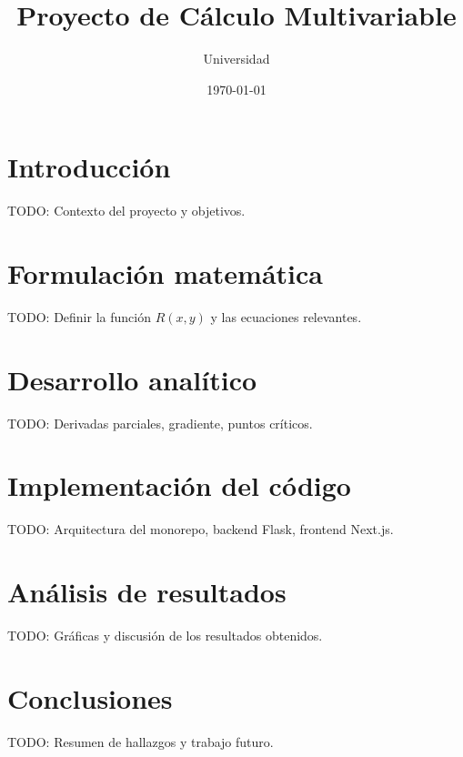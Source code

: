 \documentclass[12pt, letterpaper]{article}
\title{Proyecto de Cálculo Multivariable}
\author{Universidad}
\date{\today}
\begin{document}
\begin{titlepage}
\maketitle
\end{titlepage}

\section{Introducción}
TODO: Contexto del proyecto y objetivos.

\section{Formulación matemática}
TODO: Definir la función $R(x,y)$ y las ecuaciones relevantes.

\section{Desarrollo analítico}
TODO: Derivadas parciales, gradiente, puntos críticos.

\section{Implementación del código}
TODO: Arquitectura del monorepo, backend Flask, frontend Next.js.

\section{Análisis de resultados}
TODO: Gráficas y discusión de los resultados obtenidos.

\section{Conclusiones}
TODO: Resumen de hallazgos y trabajo futuro.
\end{document}
